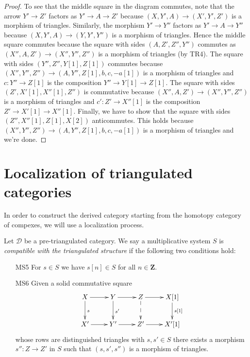 \begin{proof}
\medskip\noindent
To see that the middle square in the diagram commutes, note
that the arrow $Y' \to Z'$ factors as $Y' \to A \to Z'$
because $(X, Y', A) \to (X', Y', Z')$ is a morphism of triangles.
Similarly, the morphism $Y' \to Y''$ factors as
$Y' \to A \to Y''$ because $(X, Y', A) \to (Y, Y', Y'')$ is a
morphism of triangles. Hence the middle square commutes because
the square with sides $(A, Z', Z'', Y'')$ commutes as
$(X'', A, Z') \to (X'', Y'', Z'')$ is a morphism of triangles (by TR4).
The square with sides $(Y'', Z'', Y[1], Z[1])$ commutes
because $(X'', Y'', Z'') \to (A, Y'', Z[1], b, c , -a[1])$
is a morphism of triangles and $c : Y'' \to Z[1]$ is the composition
$Y'' \to Y[1] \to Z[1]$.
The square with sides $(Z', X'[1], X''[1], Z'')$ is commutative
because $(X'', A, Z') \to (X'', Y'', Z'')$ is a morphism of triangles
and $c' : Z' \to X''[1]$ is the composition $Z' \to X'[1] \to X''[1]$.
Finally, we have to show that the square with sides
$(Z'', X''[1], Z[1], X[2])$ anticommutes. This holds because
$(X'', Y'', Z'') \to (A, Y'', Z[1], b, c , -a[1])$
is a morphism of triangles and we're done.
\end{proof}








\section{Localization of triangulated categories}
\label{section-localization}

\noindent
In order to construct the derived category starting from the homotopy
category of compexes, we will use a localization process.

\begin{definition}
\label{definition-localization}
Let $\mathcal{D}$ be a pre-triangulated category. We say a multiplicative
system $S$ is {\it compatible with the triangulated structure} if
the following two conditions hold:
\begin{enumerate}
\item[MS5] For $s \in S$ we have $s[n] \in S$ for all $n \in \mathbf{Z}$.
\item[MS6] Given a solid commutative square
$$
\xymatrix{
X \ar[r] \ar[d]^s &
Y \ar[r] \ar[d]^{s'} &
Z \ar[r] \ar@{-->}[d] &
X[1] \ar[d]^{s[1]} \\
X' \ar[r] &
Y' \ar[r] &
Z' \ar[r] &
X'[1]
}
$$
whose rows are distinguished triangles with $s, s' \in S$
there exists a morphism $s'' : Z \to Z'$ in $S$ such that
$(s, s', s'')$ is a morphism of triangles.
\end{enumerate}
\end{definition}

